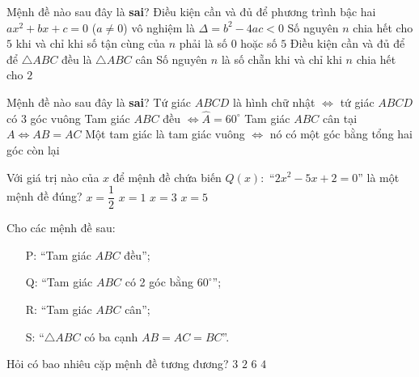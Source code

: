 \begin{ex}%
	Mệnh đề nào sau đây là \textbf{sai}?
	\choice
	{Điều kiện cần và đủ để phương trình bậc hai $ax^2+bx+c=0$ ($ a\ne 0 $) vô nghiệm là $\Delta = b^2-4ac<0$}
	{Số nguyên $n$ chia hết cho $5$ khi và chỉ khi số tận cùng của $n$ phải là số $0$ hoặc số $5$}
	{\True Điều kiện cần và đủ để để $\triangle ABC$ đều là $\triangle ABC$ cân}
	{Số nguyên $n$ là số chẵn khi và chỉ khi $n$ chia hết cho $2$} 
\end{ex}

\begin{ex}%
	Mệnh đề nào sau đây là \textbf{sai}?
	\choice
	{Tứ giác $ABCD$ là hình chữ nhật $\Leftrightarrow $ tứ giác $ABCD$ có 3 góc vuông}
	{\True Tam giác $ABC$ đều $\Leftrightarrow \widehat{A}=60^\circ$}
	{Tam giác $ABC$ cân tại $A\Leftrightarrow AB=AC$}
	{Một tam giác là tam giác vuông $\Leftrightarrow$ nó có một góc bằng tổng hai góc còn lại}
\end{ex}

\begin{ex}%
	Với giá trị nào của $x$ để mệnh đề chứa biến $Q(x)\colon$ ``$2x^2-5x+2=0$'' là một mệnh đề đúng?
	\choice
	{\True $x=\dfrac{1}{2}$}
	{$x=1$}
	{$x=3$}
	{$x=5$}
\end{ex}

\begin{ex}%
	Cho các mệnh đề sau:
	\begin{multicols}{2}
		\begin{enumerate}
			\item[P:] ``Tam giác $ABC$ đều'';
			\item[Q:] ``Tam giác $ABC$ có 2 góc bằng $60^\circ$'';
			\item[R:] ``Tam giác $ABC$ cân'';
			\item[S:] ``$\triangle ABC$ có ba cạnh $AB=AC=BC$''.
		\end{enumerate}
	\end{multicols}
	Hỏi có bao nhiêu cặp mệnh đề tương đương?
	\choice
	{\True $3$}
	{$2$}
	{$6$}
	{$4$}
\end{ex}

